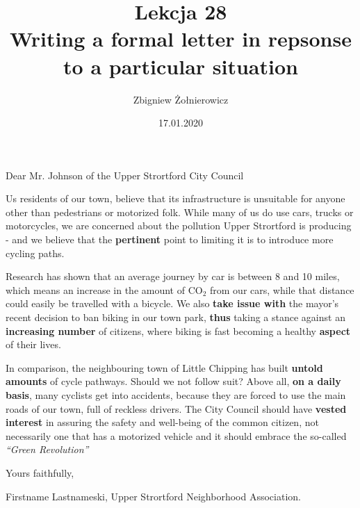 \documentclass[a4paper]{article}
\begin{document}
\title{{\huge Lekcja 28} \\
{\large Writing a formal letter in repsonse to a particular situation}}
\author{Zbigniew Żołnierowicz}
\date{17.01.2020}
\maketitle
Dear Mr. Johnson of the Upper Strortford City Council

Us residents of our town, believe that its infrastructure is unsuitable for anyone other than pedestrians or motorized folk.
While many of us do use cars, trucks or motorcycles, we are concerned about the pollution Upper Strortford is producing - and we believe that the \textbf{pertinent} point to limiting it is to introduce more cycling paths.

Research has shown that an average journey by car is between 8 and 10 miles, which means an increase in the amount of CO$_2$ from our cars, while that distance could easily be travelled with a bicycle.
We also \textbf{take issue with} the mayor's recent decision to ban biking in our town park, \textbf{thus} taking a stance against an \textbf{increasing number} of citizens, where biking is fast becoming a healthy \textbf{aspect} of their lives.

In comparison, the neighbouring town of Little Chipping has built \textbf{untold amounts} of cycle pathways.
Should we not follow suit? Above all, \textbf{on a daily basis}, many cyclists get into accidents, because they are forced to use the main roads of our town, full of reckless drivers.
The City Council should have \textbf{vested interest} in assuring the safety and well-being of the common citizen, not necessarily one that has a motorized vehicle and it should embrace the so-called \emph{``Green Revolution''}

Yours faithfully,

Firstname Lastnameski,
Upper Strortford Neighborhood Association.
\end{document}
